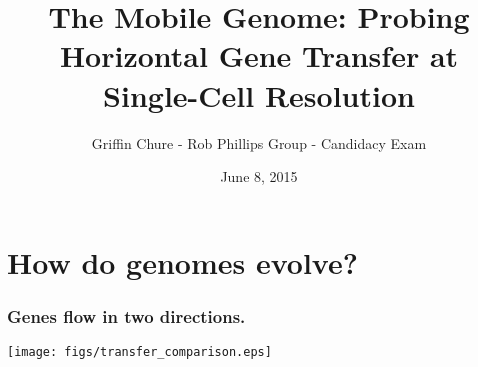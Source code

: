 
\usepackage{multimedia}
\usepackage{xltxtra}
\usepackage{polyglossia}


\title{The Mobile Genome: Probing Horizontal Gene Transfer at Single-Cell
Resolution}
\author{Griffin Chure - Rob Phillips Group - Candidacy Exam}
\date{June 8, 2015}



\begin{frame}[fragile]
	\titlepage
\end{frame}
\section{How do genomes evolve?}

\begin{frame}
	\frametitle{Genes flow in two directions.}
	\centerline{\texttt{[image: figs/transfer\_comparison.eps]}}
\end{frame}

